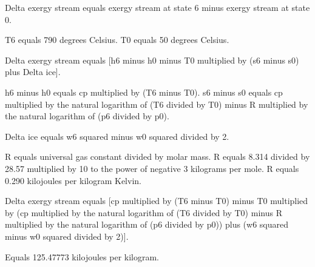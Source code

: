 Delta exergy stream equals exergy stream at state 6 minus exergy stream at state 0.  

T6 equals 790 degrees Celsius.  
T0 equals 50 degrees Celsius.  

Delta exergy stream equals [h6 minus h0 minus T0 multiplied by (s6 minus s0) plus Delta ice].  

h6 minus h0 equals cp multiplied by (T6 minus T0).  
s6 minus s0 equals cp multiplied by the natural logarithm of (T6 divided by T0) minus R multiplied by the natural logarithm of (p6 divided by p0).  

Delta ice equals w6 squared minus w0 squared divided by 2.  

R equals universal gas constant divided by molar mass.  
R equals 8.314 divided by 28.57 multiplied by 10 to the power of negative 3 kilograms per mole.  
R equals 0.290 kilojoules per kilogram Kelvin.  

Delta exergy stream equals [cp multiplied by (T6 minus T0) minus T0 multiplied by (cp multiplied by the natural logarithm of (T6 divided by T0) minus R multiplied by the natural logarithm of (p6 divided by p0)) plus (w6 squared minus w0 squared divided by 2)].  

Equals 125.47773 kilojoules per kilogram.